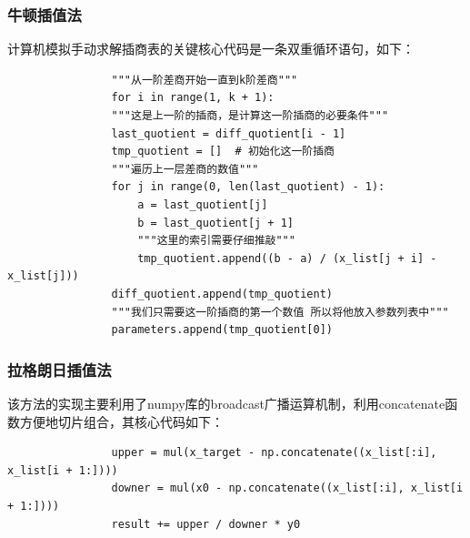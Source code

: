 \documentclass[UTF8]{ctexart}
\begin{document}
            \subsubsection{牛顿插值法}
            计算机模拟手动求解插商表的关键核心代码是一条双重循环语句，如下：
            \begin{lstlisting}
                """从一阶差商开始一直到k阶差商"""
                for i in range(1, k + 1):
                """这是上一阶的插商，是计算这一阶插商的必要条件"""
                last_quotient = diff_quotient[i - 1] 
                tmp_quotient = []  # 初始化这一阶插商
                """遍历上一层差商的数值"""
                for j in range(0, len(last_quotient) - 1):
                    a = last_quotient[j]
                    b = last_quotient[j + 1]
                    """这里的索引需要仔细推敲"""
                    tmp_quotient.append((b - a) / (x_list[j + i] - x_list[j]))
                diff_quotient.append(tmp_quotient)
                """我们只需要这一阶插商的第一个数值 所以将他放入参数列表中"""
                parameters.append(tmp_quotient[0])  
            \end{lstlisting}
            \subsubsection{拉格朗日插值法}
            该方法的实现主要利用了numpy库的broadcast广播运算机制，利用concatenate函数方便地切片组合，其核心代码如下：
            \begin{lstlisting}
                upper = mul(x_target - np.concatenate((x_list[:i], x_list[i + 1:])))
                downer = mul(x0 - np.concatenate((x_list[:i], x_list[i + 1:])))
                result += upper / downer * y0
            \end{lstlisting}
\end{document}
